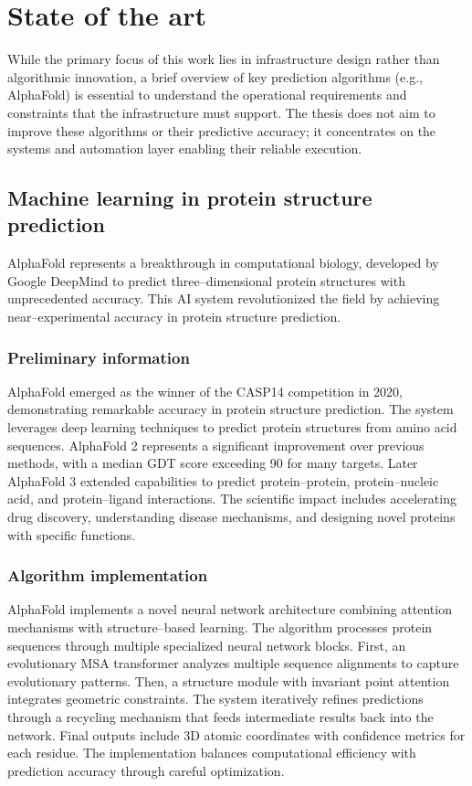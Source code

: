 

\chapter{State of the art}

While the primary focus of this work lies in infrastructure design rather than algorithmic innovation, a brief overview of key prediction algorithms (e.g., AlphaFold) is essential to understand the operational requirements and constraints that the infrastructure must support. The thesis does not aim to improve these algorithms or their predictive accuracy; it concentrates on the systems and automation layer enabling their reliable execution.


\section{Machine learning in protein structure prediction}

AlphaFold represents a breakthrough in computational biology, developed by Google DeepMind to predict three--dimensional protein structures with unprecedented accuracy.
This AI system revolutionized the field by achieving near--experimental accuracy in protein structure prediction.

\subsection{Preliminary information}

AlphaFold emerged as the winner of the CASP14 competition in 2020, demonstrating remarkable accuracy in protein structure prediction.
The system leverages deep learning techniques to predict protein structures from amino acid sequences.
AlphaFold 2 represents a significant improvement over previous methods, with a median GDT score exceeding 90 for many targets.
Later AlphaFold 3 extended capabilities to predict protein--protein, protein--nucleic acid, and protein--ligand interactions.
The scientific impact includes accelerating drug discovery, understanding disease mechanisms, and designing novel proteins with specific functions.

\subsection{Algorithm implementation}

AlphaFold implements a novel neural network architecture combining attention mechanisms with structure--based learning.
The algorithm processes protein sequences through multiple specialized neural network blocks.
First, an evolutionary MSA transformer analyzes multiple sequence alignments to capture evolutionary patterns.
Then, a structure module with invariant point attention integrates geometric constraints.
The system iteratively refines predictions through a recycling mechanism that feeds intermediate results back into the network.
Final outputs include 3D atomic coordinates with confidence metrics for each residue.
The implementation balances computational efficiency with prediction accuracy through careful optimization.

